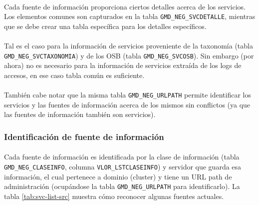 \paragraph{}
Cada fuente de informaci\'on proporciona ciertos detalles acerca de los servicios.
Los elementos comunes son capturados en la tabla \verb|GMD_NEG_SVCDETALLE|,
mientras que se debe crear una tabla espec\'ifica para los detalles espec\'ificos.

\paragraph{}
Tal es el caso para la informaci\'on de servicios proveniente de
la taxonom\'ia (tabla \verb|GMD_NEG_SVCTAXONOMIA|)
y de los OSB (tabla \verb|GMD_NEG_SVCOSB|).
Sin embargo (por ahora) no es necesario para la informaci\'on de servicios
extra\'ida de los logs de accesos, en ese caso tabla com\'un es suficiente.

\paragraph{}
Tambi\'en cabe notar que la misma tabla \verb|GMD_NEG_URLPATH| permite identificar los servicios
y las fuentes de informaci\'on acerca de los mismos sin conflictos (ya que las fuentes de informaci\'on tambi\'en son servicios).


\subsubsection{Identificaci\'on de fuente de informaci\'on}
\paragraph{}
Cada fuente de informaci\'on es identificada
por la clase de informaci\'on
(tabla \verb|GMD_NEG_CLASEINFO|, columna \verb|VLOR_LSTCLASEINFO|)
y servidor que guarda esa informaci\'on,
el cual pertenece a dominio (cluster) y tiene un URL path de administraci\'on
(ocup\'andose la tabla \verb|GMD_NEG_URLPATH| para identificarlo).
%
La tabla \ref{tab:svc-list-src} muestra c\'omo reconocer algunas fuentes actuales.

